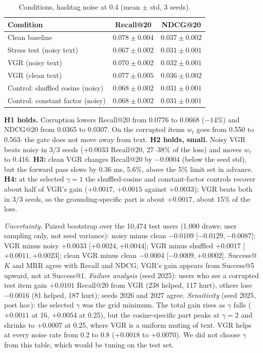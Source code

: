 \documentclass[conference]{IEEEtran}
\begin{document}
\begin{table}[!t]
\centering\footnotesize
\caption{Conditions, hashtag noise at 0.4 (mean $\pm$ std, 3 seeds).}
\label{tab:cond}
\begin{tabular}{@{}lcc@{}}
\toprule
Condition & Recall@20 & NDCG@20 \\
\midrule
Clean baseline & $0.078\pm0.004$ & $0.037\pm0.002$ \\
Stress test (noisy text) & $0.067\pm0.002$ & $0.031\pm0.001$ \\
VGR (noisy text) & $0.070\pm0.002$ & $0.032\pm0.001$ \\
VGR (clean text) & $0.077\pm0.005$ & $0.036\pm0.002$ \\
Control: shuffled cosine (noisy) & $0.068\pm0.002$ & $0.031\pm0.001$ \\
Control: constant factor (noisy) & $0.068\pm0.002$ & $0.031\pm0.001$ \\
\bottomrule
\end{tabular}
\end{table}

\textbf{H1 holds.} Corruption lowers Recall@20 from 0.0776 to 0.0668 ($-14\%$) and NDCG@20 from 0.0365 to 0.0307. On the corrupted items $w_t$ goes from 0.550 to 0.563: the gate does not move away from text. \textbf{H2 holds, small.} Noisy VGR beats noisy in 3/3 seeds ($+0.0033$ Recall@20, 27--38\% of the loss) and moves $w_t$ to 0.416. \textbf{H3:} clean VGR changes Recall@20 by $-0.0004$ (below the seed std), but the forward pass slows by 0.36 ms, 5.6\%, above the 5\% limit set in advance. \textbf{H4:} at the selected $\gamma=1$ the shuffled-cosine and constant-factor controls recover about half of VGR's gain ($+0.0017$, $+0.0015$ against $+0.0033$); VGR beats both in 3/3 seeds, so the grounding-specific part is about $+0.0017$, about 15\% of the loss.

\emph{Uncertainty.} Paired bootstrap over the 10,474 test users (1,000 draws; user sampling only, not seed variance): noisy minus clean $-0.0109$ [$-0.0129,-0.0087$]; VGR minus noisy $+0.0033$ [$+0.0024,+0.0044$]; VGR minus shuffled $+0.0017$ [$+0.0011,+0.0023$]; clean VGR minus clean $-0.0004$ [$-0.0009,+0.0002$]. Success@$K$ and MRR agree with Recall and NDCG; VGR's gain appears from Success@5 upward, not at Success@1. \emph{Failure analysis} (seed 2025): users who see a corrupted test item gain $+0.0101$ Recall@20 from VGR (238 helped, 117 hurt), others lose $-0.0016$ (81 helped, 187 hurt); seeds 2026 and 2027 agree. \emph{Sensitivity} (seed 2025, post hoc): the selected $\gamma$ was the grid minimum. The total gain rises as $\gamma$ falls ($+0.0011$ at 16, $+0.0054$ at 0.25), but the cosine-specific part peaks at $\gamma=2$ and shrinks to $+0.0007$ at 0.25, where VGR is a uniform muting of text. VGR helps at every noise rate from 0.2 to 0.8 ($+0.0018$ to $+0.0070$). We did not choose $\gamma$ from this table, which would be tuning on the test set.
\end{document}
